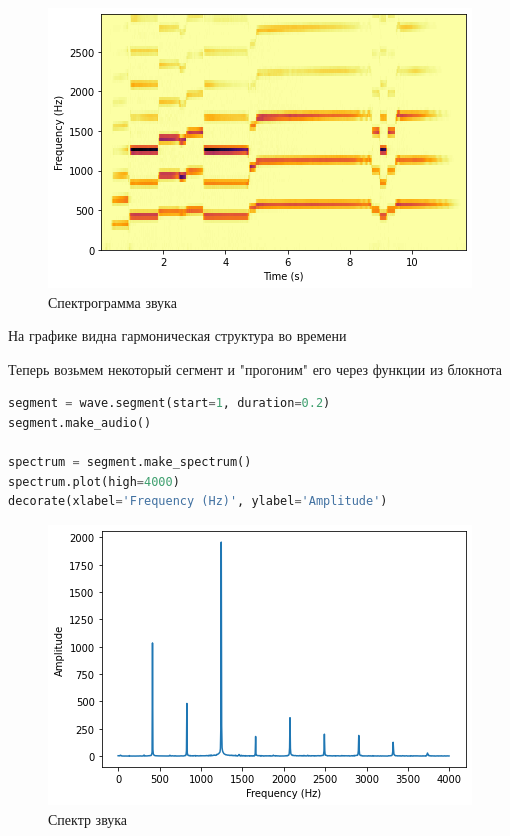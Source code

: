 \begin{figure}[H]
	\begin{center}
		\includegraphics[scale=1]{fig/lab05/lab05_10.png}
		\caption{Спектрограмма звука}
	\end{center}
\end{figure}

На графике видна гармоническая структура во времени

Теперь возьмем некоторый сегмент и "прогоним" его через функции из блокнота

\begin{lstlisting}[language=Python]
segment = wave.segment(start=1, duration=0.2)
segment.make_audio()

spectrum = segment.make_spectrum()
spectrum.plot(high=4000)
decorate(xlabel='Frequency (Hz)', ylabel='Amplitude')
\end{lstlisting}

\begin{figure}[H]
	\begin{center}
		\includegraphics[scale=1]{fig/lab05/lab05_11.png}
		\caption{Спектр звука}
	\end{center}
\end{figure}

